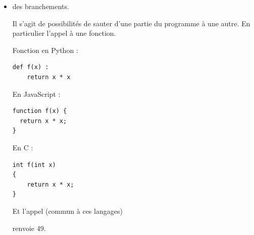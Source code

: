 \begin{itemize}
\begin{multicols}{2}
  
  \vspace{-2ex}
\begin{verbatim}
chiffres = ""
for i in range(10) :
    chiffres = chiffres + i
\end{verbatim}
  
  
   en JavaScript :
  
  \vspace{-2ex}
\begin{verbatim}
var chiffres = "";
for (var i = 0; i < 10; i++) {
  chiffres = chiffres + i;
}
\end{verbatim}
\end{multicols}

En JavaScript la boucle \texttt{pour} est définie par une initialisation, une condition à vérifier pour continuer et une instruction à exécuter en fin de boucle. (Une autre syntaxe, proche de celle de Python existe en JavaScript). Certains langages sont plus proches du \texttt{pour} algorithmique.


La boucle \texttt{while} est semblable pour les langages proposés ici. On remplace \texttt{if} par \texttt{while} pour répéter le bloc conditionnel.
  
  \item des branchements.
  
  Il s'agit de possibilités de sauter d'une partie du programme à une autre. En particulier l'appel à une fonction.
  
  

\begin{multicols}{2}  
  Fonction en Python :
  
  
  \vspace{-2ex}
\begin{verbatim}
def f(x) :
    return x * x 
\end{verbatim}
  
  
   En JavaScript :
  
  \vspace{-2ex}
\begin{verbatim}
function f(x) {
  return x * x;
}
\end{verbatim}


  
  
   En C :
  
  \vspace{-2ex}
\begin{verbatim}
int f(int x)
{
    return x * x;
}
\end{verbatim}

Et l'appel (commun à ces langages)

 renvoie 49.

\end{multicols}
  
  
  
\end{itemize} 

